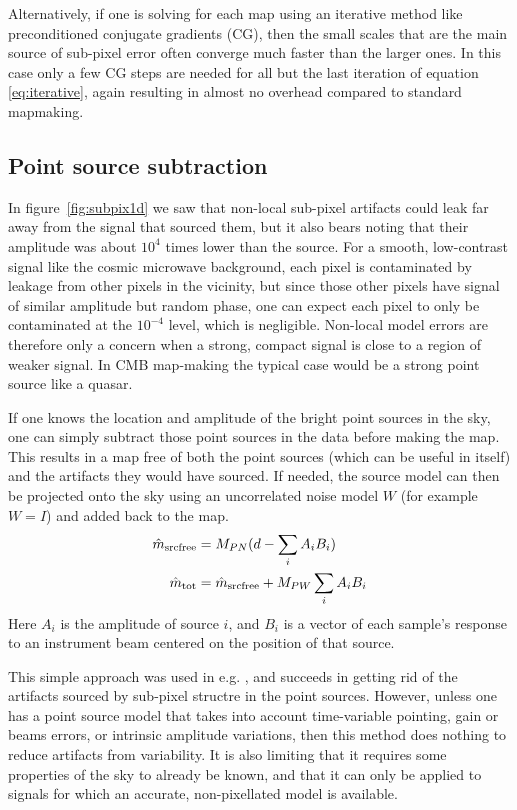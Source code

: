 \documentclass{article}
\begin{document}
Alternatively, if one is solving for each map using an iterative method
like preconditioned conjugate gradients (CG), then the small scales that are the
main source of sub-pixel error often converge much faster than the larger ones.
In this case only a few CG steps are needed for all but the last iteration
of equation \ref{eq:iterative}, again resulting in almost no overhead compared to
standard mapmaking.

\subsection{Point source subtraction}
In figure~\ref{fig:subpix1d} we saw that non-local sub-pixel artifacts could leak far away from the
signal that sourced them, but it also bears noting that their amplitude was about
$10^4$ times lower than the source. For a smooth, low-contrast signal like the
cosmic microwave background, each pixel is contaminated by leakage from
other pixels in the vicinity, but since those other pixels have signal of similar
amplitude but random phase, one can expect each pixel to only be contaminated at the
$10^{-4}$ level, which is negligible. Non-local model errors are therefore only
a concern when a strong, compact signal is close to a region of weaker signal. In
CMB map-making the typical case would be a strong point source like a quasar.

If one knows the location and amplitude of the bright point sources in the sky,
one can simply subtract those point sources in the data before making the map. This
results in a map free of both the point sources (which can be useful in itself)
and the artifacts they would have sourced. If needed, the source model can then be
projected onto the sky using an uncorrelated noise model $W$ (for example $W=I$)
and added back to the map.
\begin{align}
\hat m_\textrm{srcfree} &= M_{PN}(d - \sum_i A_i B_i) \notag \\
\hat m_\textrm{tot} &= \hat m_\textrm{srcfree} + M_{PW}\sum_i A_i B_i
\end{align}
Here $A_i$ is the amplitude of source $i$, and $B_i$ is a vector of each sample's
response to an instrument beam centered on the position of that source.

This simple approach was used in e.g. \citet{dunner/etal/2013}, and succeeds in getting
rid of the artifacts sourced by sub-pixel structre in the point sources. However, unless
one has a point source model that takes into account time-variable pointing, gain or
beams errors, or intrinsic amplitude variations, then this method does nothing to
reduce artifacts from variability. It is also limiting that it requires some properties
of the sky to already be known, and that it can only be applied to signals for which
an accurate, non-pixellated model is available.
\end{document}
